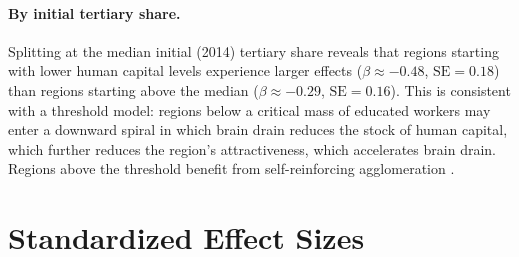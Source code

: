 \documentclass[12pt]{article}
\begin{document}
\paragraph{By initial tertiary share.} Splitting at the median initial (2014) tertiary share reveals that regions starting with lower human capital levels experience larger effects ($\beta \approx -0.48$, $\text{SE} = 0.18$) than regions starting above the median ($\beta \approx -0.29$, $\text{SE} = 0.16$). This is consistent with a threshold model: regions below a critical mass of educated workers may enter a downward spiral in which brain drain reduces the stock of human capital, which further reduces the region's attractiveness, which accelerates brain drain. Regions above the threshold benefit from self-reinforcing agglomeration \citep{berry_glaeser_2005, glaeser_saiz_2004}.


\section{Standardized Effect Sizes}
\label{sec:sde}


\end{document}
